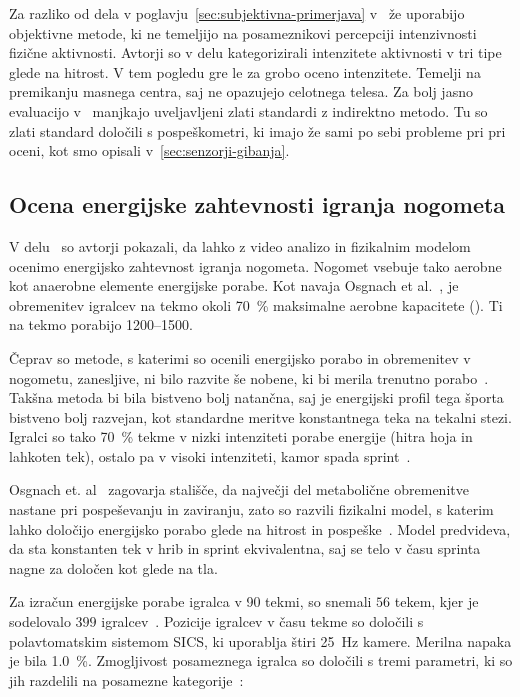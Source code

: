 Za razliko od dela v poglavju~\ref{sec:subjektivna-primerjava} v~\cite{silva2015assessing} že uporabijo objektivne metode, ki ne temeljijo na posameznikovi percepciji intenzivnosti fizične aktivnosti. Avtorji so v delu kategorizirali intenzitete aktivnosti v tri tipe glede na hitrost. V tem pogledu gre le za grobo oceno intenzitete. Temelji na premikanju masnega centra, saj ne opazujejo celotnega telesa. Za bolj jasno evaluacijo v~\cite{silva2015assessing} manjkajo uveljavljeni zlati standardi z indirektno metodo. Tu so zlati standard določili s pospeškometri, ki imajo že sami po sebi probleme pri pri oceni, kot smo opisali v~\ref{sec:senzorji-gibanja}.




\subsection{Ocena energijske zahtevnosti igranja nogometa}

V delu~\cite{osgnach2010energy} so avtorji pokazali, da lahko z video analizo in fizikalnim modelom ocenimo energijsko zahtevnost igranja nogometa. Nogomet vsebuje tako aerobne kot anaerobne elemente energijske porabe. Kot navaja Osgnach et al.~\cite{osgnach2010energy}, je obremenitev igralcev na tekmo okoli \SI{70}{\%} maksimalne aerobne kapacitete (\vomax). Ti na tekmo porabijo \SIrange{1200}{1500}{\kcal}. 

Čeprav so metode, s katerimi so ocenili energijsko porabo in obremenitev v nogometu, zanesljive, ni bilo razvite še nobene, ki bi merila trenutno porabo~\cite{osgnach2010energy}. Takšna metoda bi bila bistveno bolj natančna, saj je energijski profil tega športa bistveno bolj razvejan, kot standardne meritve konstantnega teka na tekalni stezi. Igralci so tako \SI{70}{\%} tekme v nizki intenziteti porabe energije (hitra hoja in lahkoten tek), ostalo pa v visoki intenziteti, kamor spada sprint~\cite{osgnach2010energy}. 

Osgnach et. al~\cite{osgnach2010energy} zagovarja stališče, da največji del metabolične obremenitve nastane pri pospeševanju in zaviranju, zato so razvili fizikalni model, s katerim lahko določijo energijsko porabo glede na hitrost in pospeške~\cite{osgnach2010energy}. Model predvideva, da sta konstanten tek v hrib in sprint ekvivalentna, saj se telo v času sprinta nagne za določen kot glede na tla.  

Za izračun energijske porabe igralca v \SI{90}{\min} tekmi, so snemali $56$ tekem, kjer je sodelovalo $399$ igralcev~\cite{osgnach2010energy}. Pozicije igralcev v času tekme so določili s polavtomatskim sistemom SICS, ki uporablja štiri \SI{25}{\Hz} kamere. Merilna napaka je bila \SI{1.0}{\%}. Zmogljivost posameznega igralca so določili s tremi parametri, ki so jih razdelili na posamezne kategorije~\cite{osgnach2010energy}:

